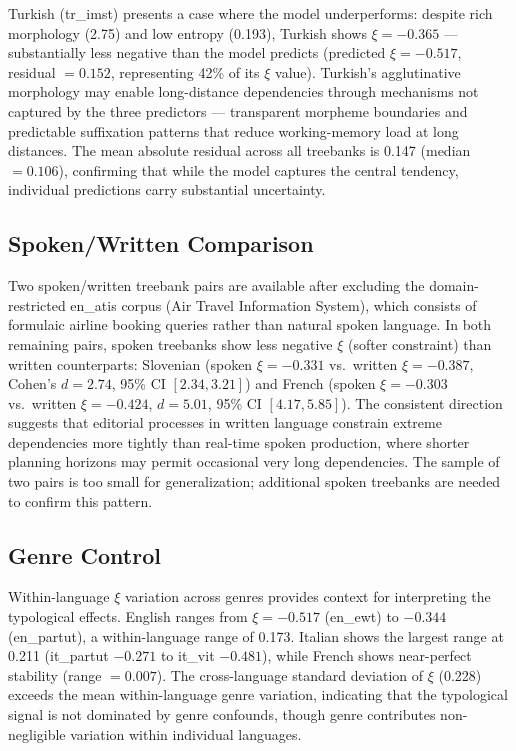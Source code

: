 \documentclass[11pt,letterpaper]{article}
\begin{document}
Turkish (tr\_imst) presents a case where the model underperforms: despite rich morphology (2.75) and low entropy (0.193), Turkish shows $\xi = -0.365$ --- substantially less negative than the model predicts (predicted $\xi = -0.517$, residual $= 0.152$, representing 42\% of its $\xi$ value). Turkish's agglutinative morphology may enable long-distance dependencies through mechanisms not captured by the three predictors --- transparent morpheme boundaries and predictable suffixation patterns that reduce working-memory load at long distances. The mean absolute residual across all treebanks is 0.147 (median $= 0.106$), confirming that while the model captures the central tendency, individual predictions carry substantial uncertainty.

\subsection{Spoken/Written Comparison}

Two spoken/written treebank pairs are available after excluding the domain-restricted en\_atis corpus (Air Travel Information System), which consists of formulaic airline booking queries rather than natural spoken language. In both remaining pairs, spoken treebanks show less negative $\xi$ (softer constraint) than written counterparts: Slovenian (spoken $\xi = -0.331$ vs.\ written $\xi = -0.387$, Cohen's $d = 2.74$, 95\% CI $[2.34, 3.21]$) and French (spoken $\xi = -0.303$ vs.\ written $\xi = -0.424$, $d = 5.01$, 95\% CI $[4.17, 5.85]$). The consistent direction suggests that editorial processes in written language constrain extreme dependencies more tightly than real-time spoken production, where shorter planning horizons may permit occasional very long dependencies. The sample of two pairs is too small for generalization; additional spoken treebanks are needed to confirm this pattern.

\subsection{Genre Control}

Within-language $\xi$ variation across genres provides context for interpreting the typological effects. English ranges from $\xi = -0.517$ (en\_ewt) to $-0.344$ (en\_partut), a within-language range of 0.173. Italian shows the largest range at 0.211 (it\_partut $-0.271$ to it\_vit $-0.481$), while French shows near-perfect stability (range $= 0.007$). The cross-language standard deviation of $\xi$ (0.228) exceeds the mean within-language genre variation, indicating that the typological signal is not dominated by genre confounds, though genre contributes non-negligible variation within individual languages.
\end{document}
